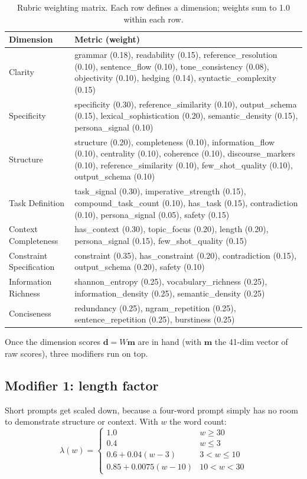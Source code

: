 \documentclass[conference]{IEEEtran}
\begin{document}
\begin{table}[t]
\centering
\caption{Rubric weighting matrix. Each row defines a dimension; weights sum to 1.0 within each row.}
\label{tab:rubric}
\small
\begin{tabularx}{\textwidth}{l X}
\toprule
\textbf{Dimension} & \textbf{Metric (weight)} \\
\midrule
Clarity & grammar (0.18), readability (0.15), reference\_resolution (0.10), sentence\_flow (0.10), tone\_consistency (0.08), objectivity (0.10), hedging (0.14), syntactic\_complexity (0.15) \\
\midrule
Specificity & specificity (0.30), reference\_similarity (0.10), output\_schema (0.15), lexical\_sophistication (0.20), semantic\_density (0.15), persona\_signal (0.10) \\
\midrule
Structure & structure (0.20), completeness (0.10), information\_flow (0.10), centrality (0.10), coherence (0.10), discourse\_markers (0.10), reference\_similarity (0.10), few\_shot\_quality (0.10), output\_schema (0.10) \\
\midrule
Task Definition & task\_signal (0.30), imperative\_strength (0.15), compound\_task\_count (0.10), has\_task (0.15), contradiction (0.10), persona\_signal (0.05), safety (0.15) \\
\midrule
Context Completeness & has\_context (0.30), topic\_focus (0.20), length (0.20), persona\_signal (0.15), few\_shot\_quality (0.15) \\
\midrule
Constraint Specification & constraint (0.35), has\_constraint (0.20), contradiction (0.15), output\_schema (0.20), safety (0.10) \\
\midrule
Information Richness & shannon\_entropy (0.25), vocabulary\_richness (0.25), information\_density (0.25), semantic\_density (0.25) \\
\midrule
Conciseness & redundancy (0.25), ngram\_repetition (0.25), sentence\_repetition (0.25), burstiness (0.25) \\
\bottomrule
\end{tabularx}
\end{table}

Once the dimension scores $\mathbf{d} = W \mathbf{m}$ are in hand (with $\mathbf{m}$ the 41-dim vector of raw scores), three modifiers run on top.

\subsection{Modifier 1: length factor}
Short prompts get scaled down, because a four-word prompt simply has no room to demonstrate structure or context. With $w$ the word count:
\[ \lambda(w) = \begin{cases}
1.0 & w \geq 30 \\
0.4 & w \leq 3 \\
0.6 + 0.04(w - 3) & 3 < w \leq 10 \\
0.85 + 0.0075(w - 10) & 10 < w < 30
\end{cases} \]
\end{document}
